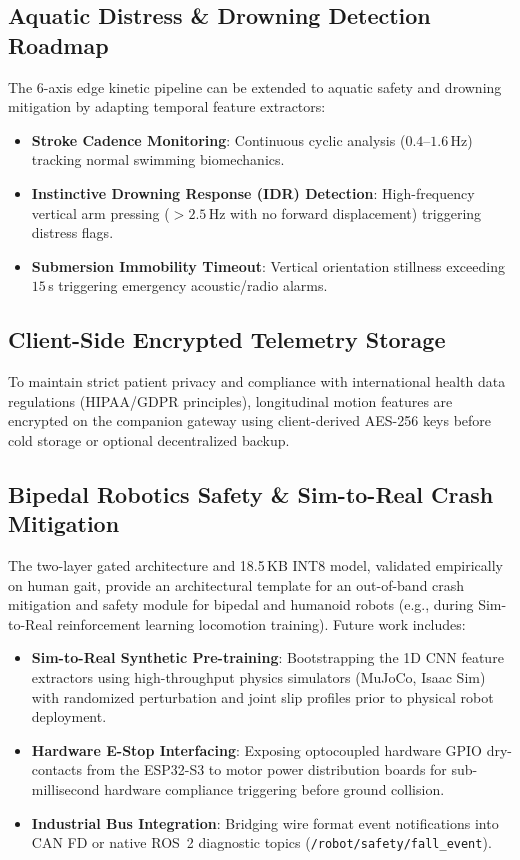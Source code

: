 \subsection{Aquatic Distress \& Drowning Detection Roadmap}

The 6-axis edge kinetic pipeline can be extended to aquatic safety and drowning mitigation by adapting temporal feature extractors:
\begin{itemize}
    \item \textbf{Stroke Cadence Monitoring}: Continuous cyclic analysis ($0.4\text{--}1.6$\,Hz) tracking normal swimming biomechanics.
    \item \textbf{Instinctive Drowning Response (IDR) Detection}: High-frequency vertical arm pressing ($>2.5$\,Hz with no forward displacement) triggering distress flags.
    \item \textbf{Submersion Immobility Timeout}: Vertical orientation stillness exceeding $15$\,s triggering emergency acoustic/radio alarms.
\end{itemize}

\subsection{Client-Side Encrypted Telemetry Storage}

To maintain strict patient privacy and compliance with international health data regulations (HIPAA/GDPR principles), longitudinal motion features are encrypted on the companion gateway using client-derived AES-256 keys before cold storage or optional decentralized backup.

\subsection{Bipedal Robotics Safety \& Sim-to-Real Crash Mitigation}

The two-layer gated architecture and 18.5\,KB INT8 model, validated empirically on human gait, provide an architectural template for an out-of-band crash mitigation and safety module for bipedal and humanoid robots (e.g., during Sim-to-Real reinforcement learning locomotion training). Future work includes:
\begin{itemize}
    \item \textbf{Sim-to-Real Synthetic Pre-training}: Bootstrapping the 1D CNN feature extractors using high-throughput physics simulators (MuJoCo, Isaac Sim) with randomized perturbation and joint slip profiles prior to physical robot deployment.
    \item \textbf{Hardware E-Stop Interfacing}: Exposing optocoupled hardware GPIO dry-contacts from the ESP32-S3 to motor power distribution boards for sub-millisecond hardware compliance triggering before ground collision.
    \item \textbf{Industrial Bus Integration}: Bridging wire format event notifications into CAN FD or native ROS~2 diagnostic topics (\texttt{/robot/safety/fall\_event}).
\end{itemize}

